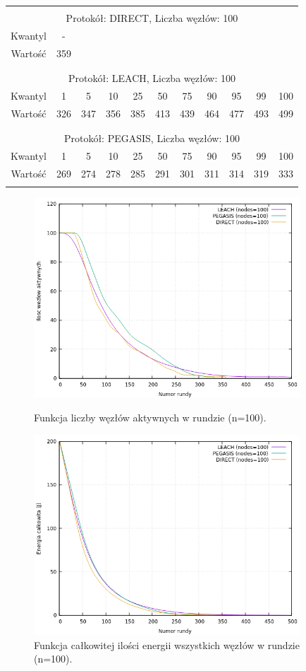 \documentclass[a4paper,12pt,twoside,openany]{report}
\begin{document}
\begin{longtable}{*{11}{c}}
\toprule \\*
\multicolumn{11}{c}{Protokół: DIRECT, Liczba węzłów: 100} \\*
Kwantyl	& -	\\*
Wartość	& 359	\\*
\midrule \\*
\\*
\multicolumn{11}{c}{Protokół: LEACH, Liczba węzłów: 100} \\*
Kwantyl	& 1	& 5	& 10	& 25	& 50	& 75	& 90	& 95	& 99	& 100	\\*
Wartość	& 326	& 347	& 356	& 385	& 413	& 439	& 464	& 477	& 493	& 499	\\*
\midrule \\*
\\*
\multicolumn{11}{c}{Protokół: PEGASIS, Liczba węzłów: 100} \\*
Kwantyl	& 1	& 5	& 10	& 25	& 50	& 75	& 90	& 95	& 99	& 100	\\*
Wartość	& 269	& 274	& 278	& 285	& 291	& 301	& 311	& 314	& 319	& 333	\\*
\bottomrule \\*
\end{longtable}

\begin{figure}[H]
 \centering
 \includegraphics[width=10cm]{images/gnuplot/test_2/nodes_in_round_100.png}
 \caption{Funkcja liczby węzłów aktywnych w rundzie (n=100).}
 \includegraphics[width=10cm]{images/gnuplot/test_2/energy_in_round_100.png}
 \caption{Funkcja całkowitej ilości energii wszystkich węzłów w rundzie (n=100).}
\end{figure}
\end{document}

